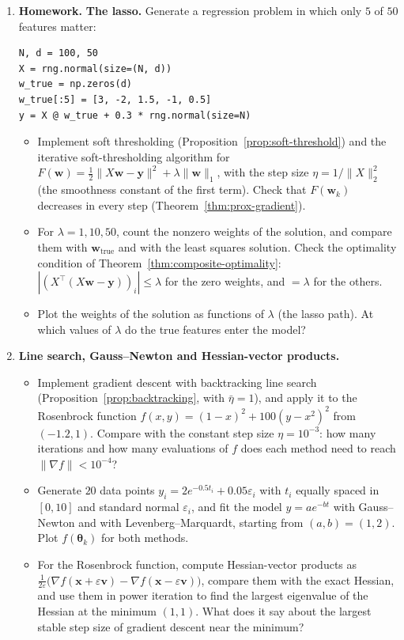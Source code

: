 \documentclass[11pt]{article}
\newcommand{\homework}{\textcolor{red!70!black}{\textbf{Homework.}}}
\newcommand{\norm}[1]{\lVert #1 \rVert}
\theoremstyle{definition}
\theoremstyle{plain}
\theoremstyle{remark}
\begin{document}
\begin{enumerate}[label=\textbf{P\arabic*.}, leftmargin=*]
    \item \homework{} \textbf{The lasso.} Generate a regression problem in which only $5$ of $50$ features matter:
\begin{lstlisting}
N, d = 100, 50
X = rng.normal(size=(N, d))
w_true = np.zeros(d)
w_true[:5] = [3, -2, 1.5, -1, 0.5]
y = X @ w_true + 0.3 * rng.normal(size=N)
\end{lstlisting}
    \begin{itemize}
        \item Implement soft thresholding (Proposition~\ref{prop:soft-threshold}) and the iterative soft-thresholding algorithm for $F(\mathbf{w}) = \frac{1}{2}\norm{X\mathbf{w} - \mathbf{y}}^2 + \lambda\norm{\mathbf{w}}_1$, with the step size $\eta = 1/\norm{X}_2^2$ (the smoothness constant of the first term). Check that $F(\mathbf{w}_k)$ decreases in every step (Theorem~\ref{thm:prox-gradient}).
        \item For $\lambda = 1, 10, 50$, count the nonzero weights of the solution, and compare them with $\mathbf{w}_{\text{true}}$ and with the least squares solution. Check the optimality condition of Theorem~\ref{thm:composite-optimality}: $|(X^\top(X\mathbf{w} - \mathbf{y}))_i| \leq \lambda$ for the zero weights, and $= \lambda$ for the others.
        \item Plot the weights of the solution as functions of $\lambda$ (the lasso path). At which values of $\lambda$ do the true features enter the model?
    \end{itemize}

    \item \textbf{Line search, Gauss--Newton and Hessian-vector products.}
    \begin{itemize}
        \item Implement gradient descent with backtracking line search (Proposition~\ref{prop:backtracking}, with $\bar\eta = 1$), and apply it to the Rosenbrock function $f(x, y) = (1 - x)^2 + 100(y - x^2)^2$ from $(-1.2, 1)$. Compare with the constant step size $\eta = 10^{-3}$: how many iterations and how many evaluations of $f$ does each method need to reach $\norm{\nabla f} < 10^{-4}$?
        \item Generate $20$ data points $y_i = 2e^{-0.5t_i} + 0.05\varepsilon_i$ with $t_i$ equally spaced in $[0, 10]$ and standard normal $\varepsilon_i$, and fit the model $y = ae^{-bt}$ with Gauss--Newton and with Levenberg--Marquardt, starting from $(a, b) = (1, 2)$. Plot $f(\boldsymbol{\theta}_k)$ for both methods.
        \item For the Rosenbrock function, compute Hessian-vector products as $\frac{1}{2\varepsilon}\big(\nabla f(\mathbf{x} + \varepsilon\mathbf{v}) - \nabla f(\mathbf{x} - \varepsilon\mathbf{v})\big)$, compare them with the exact Hessian, and use them in power iteration to find the largest eigenvalue of the Hessian at the minimum $(1, 1)$. What does it say about the largest stable step size of gradient descent near the minimum?
    \end{itemize}
\end{enumerate}
\end{document}
